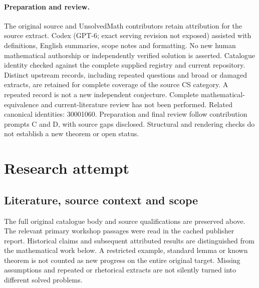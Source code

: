 \documentclass[11pt]{article}
\begin{document}
\paragraph{Preparation and review.}
The original source and UnsolvedMath contributors retain attribution for the source extract. Codex (GPT-6; exact serving revision not exposed) assisted with definitions, English summaries, scope notes and formatting. No new human mathematical authorship or independently verified solution is asserted. Catalogue identity checked against the complete supplied registry and current repository. Distinct upstream records, including repeated questions and broad or damaged extracts, are retained for complete coverage of the source CS category. A repeated record is not a new independent conjecture. Complete mathematical-equivalence and current-literature review has not been performed. Related canonical identities: 30001060. Preparation and final review follow contribution prompts C and D, with source gaps disclosed. Structural and rendering checks do not establish a new theorem or open status.
\label{end:statement}

\section{Research attempt}
\subsection{Literature, source context and scope}
The full original catalogue body and source qualifications are preserved above. The relevant primary workshop passages were read in the cached publisher report. Historical claims and subsequent attributed results are distinguished from the mathematical work below. A restricted example, standard lemma or known theorem is not counted as new progress on the entire original target. Missing assumptions and repeated or rhetorical extracts are not silently turned into different solved problems.
\end{document}
